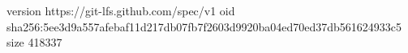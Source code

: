 version https://git-lfs.github.com/spec/v1
oid sha256:5ee3d9a557afebaf11d217db07fb7f2603d9920ba04ed70ed37db561624933c5
size 418337
